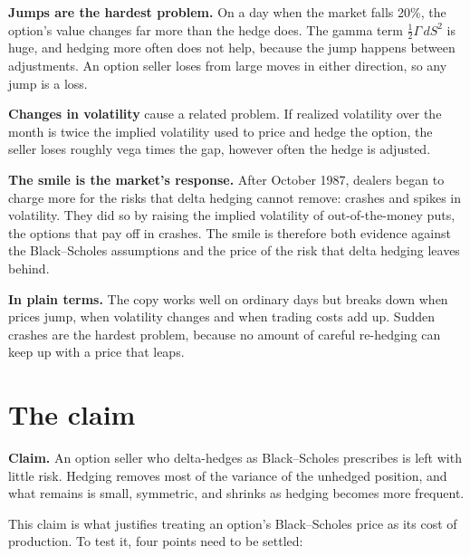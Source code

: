 \textbf{Jumps are the hardest problem.} On a day when the market falls 20\%, the option's value changes far more than the hedge does. The gamma term $\tfrac{1}{2}\Gamma\,dS^2$ is huge, and hedging more often does not help, because the jump happens between adjustments. An option seller loses from large moves in either direction, so any jump is a loss.

\textbf{Changes in volatility} cause a related problem. If realized volatility over the month is twice the implied volatility used to price and hedge the option, the seller loses roughly vega times the gap, however often the hedge is adjusted.

\textbf{The smile is the market's response.} After October 1987, dealers began to charge more for the risks that delta hedging cannot remove: crashes and spikes in volatility. They did so by raising the implied volatility of out-of-the-money puts, the options that pay off in crashes. The smile is therefore both evidence against the Black--Scholes assumptions and the price of the risk that delta hedging leaves behind.

\noindent\textbf{In plain terms.} The copy works well on ordinary days but breaks down when prices jump, when volatility changes and when trading costs add up. Sudden crashes are the hardest problem, because no amount of careful re-hedging can keep up with a price that leaps.

\section{The claim}
\label{sec:14-claim}

\begin{callout}
\textbf{Claim.} An option seller who delta-hedges as Black--Scholes prescribes is left with little risk. Hedging removes most of the variance of the unhedged position, and what remains is small, symmetric, and shrinks as hedging becomes more frequent.
\end{callout}

This claim is what justifies treating an option's Black--Scholes price as its cost of production. To test it, four points need to be settled:

